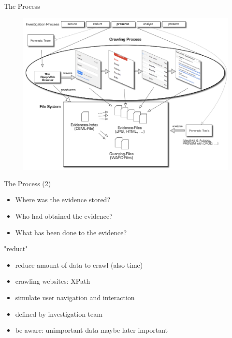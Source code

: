 \documentclass{beamer}
\begin{document}
\begin{frame}{The Process}

\begin{figure}
\includegraphics[scale=0.3]{figure-1.png}
\end{figure}

\end{frame}

\begin{frame}{The Process (2)}

\begin{itemize}
  \item Where was the evidence stored?
  \item Who had obtained the evidence?
  \item What has been done to the evidence?
\end{itemize}

\end{frame}

\begin{frame}{"reduct"}

\begin{itemize}
  \item reduce amount of data to crawl (also time)
  \item crawling websites: XPath
  \item simulate user navigation and interaction
  \item defined by investigation team
  \item be aware: unimportant data maybe later important
\end{itemize}

\end{frame}
\end{document}
